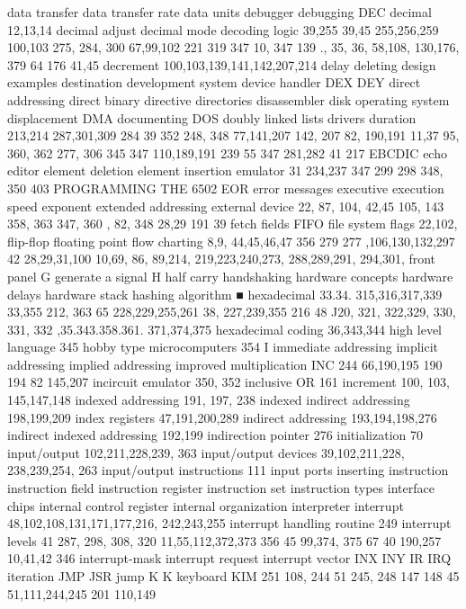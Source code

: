 {{{{{{{{{{{{{{{{{{{{{{{{{{{{{{{{{{{{{{{{{{{{{{{{{{{{{{{{{{{{{{{{{{{{{{{{{{{{{{{{{{{{{{{{{{{{{{{{{{{{{{{{{{{{{{{{{{{{{{{{{{{{{{{{{{{{{{{{{{{{data transfer
data transfer rate
data units
debugger
debugging
DEC
decimal 12,13,14
decimal adjust
decimal mode
decoding logic
39,255
39,45
255,256,259
100,103
275, 284, 300
67,99,102
221
319
347
10, 347
139
., 35, 36, 58,108,
130,176, 379
64
176
41,45
decrement 100,103,139,141,142,207,214
delay
deleting
design examples
destination
development system
device handler
DEX
DEY
direct addressing
direct binary
directive
directories
disassembler
disk operating system
displacement
DMA
documenting
DOS
doubly linked lists
drivers
duration
213,214
287,301,309
284
39
352
248, 348
77,141,207
142, 207
82, 190,191
11,37
95, 360, 362
277, 306
345
347
110,189,191
239
55
347
281,282
41
217
EBCDIC
echo
editor
element deletion
element insertion
emulator
31
234,237
347
299
298
348, 350
403
PROGRAMMING THE 6502
EOR
error messages
executive
execution speed
exponent
extended addressing
external device
22, 87, 104,
42,45
105, 143
358, 363
347, 360
, 82, 348
28,29
191
39
fetch
fields
FIFO
file system
flags 22,102,
flip-flop
floating point
flow charting 8,9,
44,45,46,47
356
279
277
,106,130,132,297
42
28,29,31,100
10,69, 86, 89,214,
219,223,240,273, 288,289,291,
294,301,
front panel
G
generate a signal
H
half carry
handshaking
hardware concepts
hardware delays
hardware stack
hashing algorithm ■
hexadecimal 33.34.
315,316,317,339
33,355
212, 363
65
228,229,255,261
38, 227,239,355
216
48
J20, 321, 322,329,
330, 331, 332
,35.343.358.361.
371,374,375
hexadecimal coding 36,343,344
high level language 345
hobby type microcomputers 354
I
immediate addressing
implicit addressing
implied addressing
improved multiplication
INC
244
66,190,195
190
194
82
145,207
incircuit emulator 350, 352
inclusive OR 161
increment 100, 103, 145,147,148
indexed addressing 191, 197, 238
indexed indirect addressing 198,199,209
index registers 47,191,200,289
indirect addressing 193,194,198,276
indirect indexed addressing 192,199
indirection pointer 276
initialization 70
input/output 102,211,228,239, 363
input/output devices 39,102,211,228,
238,239,254, 263
input/output instructions 111
input ports
inserting
instruction
instruction field
instruction register
instruction set
instruction types
interface chips
internal control register
internal organization
interpreter
interrupt 48,102,108,131,171,177,216,
242,243,255
interrupt handling routine 249
interrupt levels
41
287, 298, 308, 320
11,55,112,372,373
356
45
99,374, 375
67
40
190,257
10,41,42
346
interrupt-mask
interrupt request
interrupt vector
INX
INY
IR
IRQ
iteration
JMP
JSR
jump
K
K
keyboard
KIM
251
108, 244
51
245, 248
147
148
45
51,111,244,245
201
110,149
}}}}}}}}}}}}}}}}}}}}}}}}}}}}}}}}}}}}}}}}}}}}}}}}}}}}}}}}}}}}}}}}}}}}}}}}}}}}}}}}}}}}}}}}}}}}}}}}}}}}}}}}}}}}}}}}}}}}}}}}}}}}}}}}}}}}}}}}}}}}
